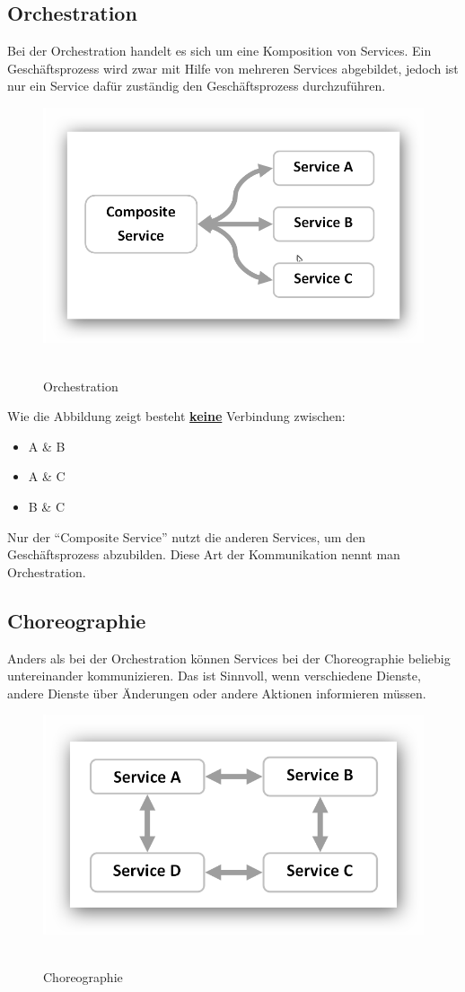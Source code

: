 \subsection*{Orchestration}
\label{subsec:orchestration}
Bei der Orchestration handelt es sich um eine Komposition von Services. Ein Geschäftsprozess wird zwar mit Hilfe von mehreren Services abgebildet, jedoch ist nur ein Service dafür zuständig den Geschäftsprozess durchzuführen.
\newpage
\begin{figure}[htb]
    \centering 
    \includegraphics[width=\linewidth]{content/images/ServiceOrchestration}\
    \caption[Orchestration]{Orchestration}
    \label{fig:ServiceOrchestration}  
\end{figure}

Wie die Abbildung zeigt besteht \textbf{\underline{keine}} Verbindung zwischen:
\begin{itemize}
    \item A \& B
    \item A \& C
    \item B \& C
\end{itemize}
Nur der "`Composite Service"' nutzt die anderen Services, um den Geschäftsprozess abzubilden. Diese Art der Kommunikation nennt man Orchestration.
        
\subsection*{Choreographie}
\label{subsec:choreographie}
Anders als bei der Orchestration können Services bei der Choreographie beliebig untereinander kommunizieren. Das ist Sinnvoll, wenn verschiedene Dienste, andere Dienste über Änderungen oder andere Aktionen informieren müssen.
        
\begin{figure}[htb]
    \centering 
    \includegraphics[width=\linewidth]{content/images/ServiceChoreography}\
    \caption[Choreographie]{Choreographie}
    \label{fig:ServiceOrchestration}  
\end{figure}